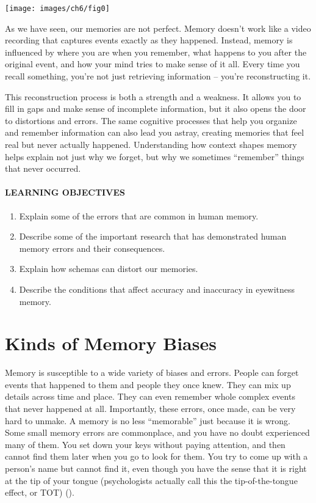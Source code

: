 \documentclass[
]{krantz}
\providecommand{\tightlist}{%
  \setlength{\itemsep}{0pt}\setlength{\parskip}{0pt}}
\begin{document}
\begin{center}\texttt{[image: images/ch6/fig0]} \end{center}

As we have seen, our memories are not perfect. Memory doesn't work like a video recording that captures events exactly as they happened. Instead, memory is influenced by where you are when you remember, what happens to you after the original event, and how your mind tries to make sense of it all. Every time you recall something, you're not just retrieving information -- you're reconstructing it.

This reconstruction process is both a strength and a weakness. It allows you to fill in gaps and make sense of incomplete information, but it also opens the door to distortions and errors. The same cognitive processes that help you organize and remember information can also lead you astray, creating memories that feel real but never actually happened. Understanding how context shapes memory helps explain not just why we forget, but why we sometimes ``remember'' things that never occurred.

\paragraph*{LEARNING OBJECTIVES}\label{learning-objectives-5}

\begin{enumerate}
\def\labelenumi{\arabic{enumi}.}
\tightlist
\item
  Explain some of the errors that are common in human memory.
\item
  Describe some of the important research that has demonstrated human memory errors and their consequences.
\item
  Explain how schemas can distort our memories.
\item
  Describe the conditions that affect accuracy and inaccuracy in eyewitness memory.
\end{enumerate}

\section{Kinds of Memory Biases}\label{kinds-of-memory-biases}

Memory is susceptible to a wide variety of biases and errors. People can forget events that happened to them and people they once knew. They can mix up details across time and place. They can even remember whole complex events that never happened at all. Importantly, these errors, once made, can be very hard to unmake. A memory is no less ``memorable'' just
because it is wrong. Some small memory errors are commonplace, and you have no doubt
experienced many of them. You set down your keys without paying attention, and then cannot find them later when you go to look for them. You try to come up with a person's name but cannot find it, even though you have the sense that it is right at the tip of your tongue (psychologists actually call this the tip-of-the-tongue effect, or TOT) ().
\end{document}
